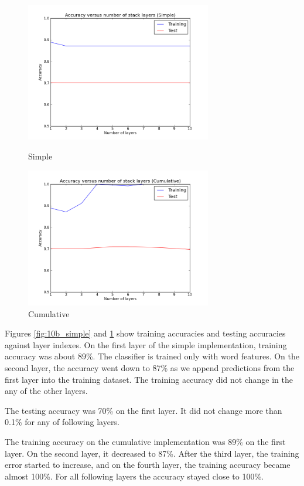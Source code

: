 \begin{figure}[ht]
	\begin{minipage}[b]{0.5\linewidth}
		\centering
		\includegraphics[width=3.2in]{images/wu10b_simple.png}
		\caption{Simple}
		\label{fig:10b_simple}
	\end{minipage}
	\hspace{0.5cm}
	\begin{minipage}[b]{0.5\linewidth}
		\centering
		\includegraphics[width=3.2in]{images/wu10b_cumulative.png}
		\caption{Cumulative}
		\label{fig:10b_cumulative}
	\end{minipage}
\end{figure}

Figures \ref{fig:10b_simple} and \ref{fig:10b_cumulative} show training accuracies and testing accuracies against layer indexes. On the first layer of the simple implementation, training accuracy was about 89\%. The classifier is trained only with word features. On the second layer, the accuracy went down to 87\% as we append predictions from the first layer into the training dataset. The training accuracy did not change in the any of the other layers. 

The testing accuracy was 70\% on the first layer. It did not change more than 0.1\% for any of following layers.

The training accuracy on the cumulative implementation was 89\% on the first layer. On the second layer, it decreased to 87\%. After the third layer, the training error started to increase, and on the fourth layer, the training accuracy became almost 100\%. For all following layers the accuracy stayed close to 100\%.


